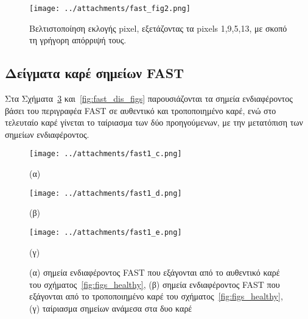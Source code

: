 \begin{figure}[!hb]
\begin{minipage}[b]{1.0\linewidth}
\centering
\texttt{[image: ../attachments/fast\_fig2.png]}
\caption{Βελτιστοποίηση εκλογής pixel, εξετάζοντας τα pixels 1,9,5,13, με σκοπό τη γρήγορη απόρριψή τους.}
\label{fig:fast_fig2}
\end{minipage}

 \end{figure}  
 
 \newpage

\subsection{Δείγματα καρέ σημείων FAST}
 
Στα Σχήματα~\ref{fig:fast_healthy_figs} και~\ref{fig:fast_dis_figs} παρουσιάζονται τα σημεία ενδιαφέροντος βάσει του περιγραφέα FAST σε αυθεντικό και τροποποιημένο καρέ, ενώ στο τελευταίο καρέ 
γίνεται το ταίριασμα των δύο προηγούμενων, με την μετατόπιση των σημείων ενδιαφέροντος.\\
 
 
\begin{figure}[!ht]
\begin{minipage}[b]{0.5\linewidth}
\centering
\texttt{[image: ../attachments/fast1\_c.png]}
\caption*{(α)}
\label{fig:fast_1}
\end{minipage}
\hspace{0.9cm}
\begin{minipage}[b]{0.5\linewidth}
\centering
\texttt{[image: ../attachments/fast1\_d.png]}
\caption*{(β)}
\label{fig:fast_2}
\end{minipage}

\end{figure} 


\begin{figure}[!h]
\begin{minipage}[b]{1.0\linewidth}
\centering
\texttt{[image: ../attachments/fast1\_e.png]}
\caption*{(γ)}
\label{fig:fast_3}
\end{minipage}
\caption{(α) σημεία ενδιαφέροντος FAST που εξάγονται από το αυθεντικό καρέ του σχήματος~\ref{fig:figs_healthy},
(β) σημεία ενδιαφέροντος FAST που εξάγονται από το τροποποιημένο καρέ του σχήματος~\ref{fig:figs_healthy},
(γ) ταίριασμα σημείων ανάμεσα στα δυο καρέ}
\label{fig:fast_healthy_figs} 
 \end{figure} 

 \newpage



